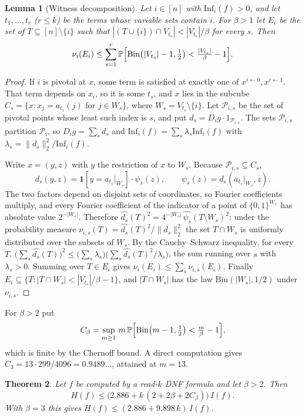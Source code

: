 \documentclass[11pt]{amsart}
\newtheorem{theorem}{Theorem}[section]
\newtheorem{lemma}[theorem]{Lemma}
\theoremstyle{definition}
\theoremstyle{remark}
\renewcommand{\Pr}{\mathbb{P}}
\newcommand{\Inf}{\mathrm{Inf}}
\newcommand{\Bin}{\mathrm{Bin}}
\newcommand{\bits}{\{0,1\}}
\begin{document}
\begin{lemma}[Witness decomposition]\label{lem:witness}
Let $i\in[n]$ with $\Inf_i(f)>0$, and let $t_1,\dots,t_r$ ($r\le k$) be the terms whose variable sets contain $i$.
For $\beta>1$ let $E_i$ be the set of $T\subseteq[n]\setminus\{i\}$ such that
$|(T\cup\{i\})\cap V_{t_s}|<|V_{t_s}|/\beta$ for every $s$. Then
\[
\nu_i(E_i)\le\sum_{s=1}^r\Pr\Bigl[\Bin\bigl(|V_{t_s}|-1,\tfrac12\bigr)<\tfrac{|V_{t_s}|}{\beta}-1\Bigr].
\]
\end{lemma}

\begin{proof}
If $i$ is pivotal at $x$, some term is satisfied at exactly one of $x^{i\leftarrow0},x^{i\leftarrow1}$. That term
depends on $x_i$, so it is some $t_s$, and $x$ lies in the subcube
$C_s=\{x:x_j=a_{t_s}(j)\text{ for }j\in W_s\}$, where $W_s=V_{t_s}\setminus\{i\}$. Let $\mathcal P_{i,s}$ be the
set of pivotal points whose least such index is $s$, and put $d_s=D_ig\cdot1_{\mathcal P_{i,s}}$. The sets
$\mathcal P_{i,s}$ partition $\mathcal P_i$, so $D_ig=\sum_sd_s$ and $\Inf_i(f)=\sum_s\lambda_s\Inf_i(f)$ with
$\lambda_s=\|d_s\|_2^2/\Inf_i(f)$.

Write $x=(y,z)$ with $y$ the restriction of $x$ to $W_s$. Because $\mathcal P_{i,s}\subseteq C_s$,
\[
d_s(y,z)=\mathbf 1[y=a_{t_s}|_{W_s}]\cdot\psi_s(z),\qquad \psi_s(z)=d_s(a_{t_s}|_{W_s},z).
\]
The two factors depend on disjoint sets of coordinates, so Fourier coefficients multiply, and every Fourier
coefficient of the indicator of a point of $\bits^{W_s}$ has absolute value $2^{-|W_s|}$. Therefore
$\widehat{d_s}(T)^2=4^{-|W_s|}\,\widehat{\psi_s}(T\setminus W_s)^2$: under the probability measure
$\nu_{i,s}(T)=\widehat{d_s}(T)^2/\|d_s\|_2^2$ the set $T\cap W_s$ is uniformly distributed over the subsets of $W_s$.
By the Cauchy--Schwarz inequality, for every $T$,
$\bigl(\sum_s\widehat{d_s}(T)\bigr)^2\le\bigl(\sum_s\lambda_s\bigr)\bigl(\sum_s\widehat{d_s}(T)^2/\lambda_s\bigr)$,
the sum running over $s$ with $\lambda_s>0$. Summing over $T\in E_i$ gives $\nu_i(E_i)\le\sum_s\nu_{i,s}(E_i)$.
Finally $E_i\subseteq\{T:|T\cap W_s|<|V_{t_s}|/\beta-1\}$, and $|T\cap W_s|$ has the law $\Bin(|W_s|,1/2)$ under
$\nu_{i,s}$.
\end{proof}

For $\beta>2$ put
\[
C_\beta=\sup_{m\ge1}\,m\,\Pr\Bigl[\Bin\bigl(m-1,\tfrac12\bigr)<\tfrac m\beta-1\Bigr],
\]
which is finite by the Chernoff bound. A direct computation gives $C_3=13\cdot299/4096=0.9489\ldots$, attained at
$m=13$.

\begin{theorem}\label{thm:readk-main}
Let $f$ be computed by a read-$k$ DNF formula and let $\beta>2$. Then
\[
H(f)\le\bigl(2.886+k\,(2+2\beta+2C_\beta)\bigr)\,I(f).
\]
With $\beta=3$ this gives $H(f)\le(2.886+9.898\,k)\,I(f)$.
\end{theorem}
\end{document}
